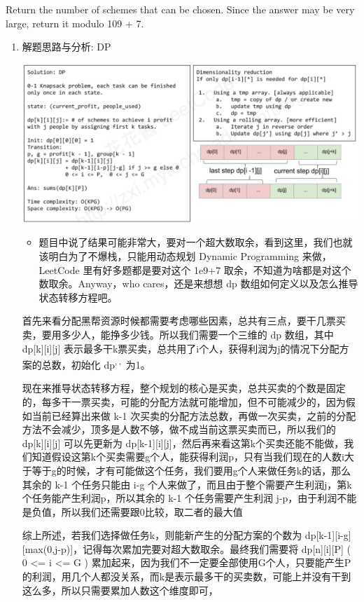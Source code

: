 \documentclass[9pt, b5paaper]{book}
\begin{document}
Return the number of schemes that can be chosen. Since the answer may be very large, return it modulo 109 + 7.
\begin{enumerate}
\item 解题思路与分析: DP
\label{sec-1-4-27-0-1}

\includegraphics[width=.9\linewidth]{./pic/crime.png}

\begin{itemize}
\item 题目中说了结果可能非常大，要对一个超大数取余，看到这里，我们也就该明白为了不爆栈，只能用动态规划 Dynamic Programming 来做，LeetCode 里有好多题都是要对这个 1e9+7 取余，不知道为啥都是对这个数取余。Anyway，who cares，还是来想想 dp 数组如何定义以及怎么推导状态转移方程吧。
\end{itemize}

首先来看分配黑帮资源时候都需要考虑哪些因素，总共有三点，要干几票买卖，要用多少人，能挣多少钱。所以我们需要一个三维的 dp 数组，其中 dp[k][i][j] 表示最多干k票买卖，总共用了i个人，获得利润为j的情况下分配方案的总数，初始化 dp\footnotemark[1]{}\textsuperscript{,}\,\footnotemark[1]{}\textsuperscript{,}\,\footnotemark[1]{} 为1。

现在来推导状态转移方程，整个规划的核心是买卖，总共买卖的个数是固定的，每多干一票买卖，可能的分配方法就可能增加，但不可能减少的，因为假如当前已经算出来做 k-1 次买卖的分配方法总数，再做一次买卖，之前的分配方法不会减少，顶多是人数不够，做不成当前这票买卖而已，所以我们的 dp[k][i][j] 可以先更新为 dp[k-1][i][j]，然后再来看这第k个买卖还能不能做，我们知道假设这第k个买卖需要g个人，能获得利润p，只有当我们现在的人数i大于等于g的时候，才有可能做这个任务，我们要用g个人来做任务k的话，那么其余的 k-1 个任务只能由 i-g 个人来做了，而且由于整个需要产生利润j，第k个任务能产生利润p，所以其余的 k-1 个任务需要产生利润 j-p，由于利润不能是负值，所以我们还需要跟0比较，取二者的最大值

综上所述，若我们选择做任务k，则能新产生的分配方案的个数为 dp[k-1][i-g][max(0,j-p)]，记得每次累加完要对超大数取余。最终我们需要将 dp[n][i][P] ( 0 <= i <= G ) 累加起来，因为我们不一定要全部使用G个人，只要能产生P的利润，用几个人都没关系，而k是表示最多干的买卖数，可能上并没有干到这么多，所以只需要累加人数这个维度即可，


\end{enumerate}
\end{document}
